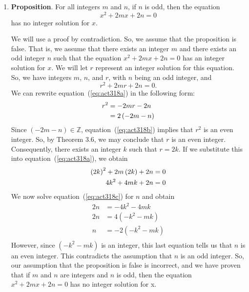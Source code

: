 \begin{enumerate}
\begin{enumerate}
\item
\noindent
\textbf{Proposition}.  For all integers $m$ and $n$, if $n$ is odd, then the equation
   \[
   x^2+2mx+2n=0
   \]
   has no integer solution for $x$.
\begin{myproof}
We will use a proof by contradiction.  So, we assume that the proposition is false.  That is, we assume that there exists an integer  $m$  and there exists an odd integer $n$  such that the equation $x^2  + 2mx + 2n = 0$ has an integer solution for  $x$.  We will let  $r$ represent an integer solution for this equation.  So, we have integers  $m$, $n$, and  $r$, with  $n$  being an odd integer, and
\setcounter{equation}{0}
\begin{equation} \label{eq:act318a}
r^2  + 2mr + 2n = 0.
\end{equation}
We can rewrite equation~(\ref{eq:act318a}) in the following form:
\begin{align}
  r^2  &=  - 2mr - 2n \notag \\ 
       &= 2\left( { - 2m - n} \right) \label{eq:act318b} 
\end{align} 
Since  $\left( { - 2m - n} \right) \in \mathbb{Z}$, equation~(\ref{eq:act318b}) implies that  
$r^2 $ is an even integer.  So, by Theorem 3.6, we may conclude that  $r$  is an even integer.  Consequently, there exists an integer  $k$  such that  $r = 2k$.  If we substitute this into equation~(\ref{eq:act318a}), we obtain
\begin{align}
  \left( {2k} \right)^2  + 2m\left( {2k} \right) + 2n &= 0 \notag \\ 
                                     4k^2  + 4mk + 2n &= 0 \label{eq:act318c} 
\end{align}
We now solve equation~(\ref{eq:act318c}) for  $n$ and obtain
\[
\begin{aligned}
  2n &=  - 4k^2  - 4mk \\ 
  2n &= 4\left( { - k^2  - mk} \right) \\ 
   n &=  - 2\left( { - k^2  - mk} \right) \\ 
\end{aligned} 
\]
However, since  $\left( { - k^2  - mk} \right)$ is an integer, this last equation tells us that  
$n$  is an even integer.  This contradicts the assumption that  $n$  is an odd integer.  So, our assumption that the proposition is false is incorrect, and we have proven that if  $m$  and  $n$  are integers and  $n$  is odd, then the equation  $x^2  + 2mx + 2n = 0$ has no integer solution for  x.
\end{myproof}
\end{enumerate}

\end{enumerate}




\hbreak

\endinput
